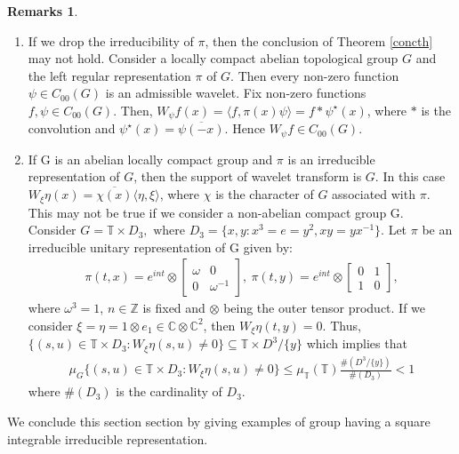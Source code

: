 \documentclass[11pt,reqno]{amsart}
\numberwithin{equation}{section}
\theoremstyle{definition}
\newtheorem{rems}[thm]{\sc Remarks}
\begin{document}
\begin{rems} \noindent
\begin{enumerate}
 \item If we drop the irreducibility of $\pi$, then the conclusion of  Theorem \ref{concth} may not hold.
 Consider a locally compact  abelian topological group $G$ and the left regular representation $\pi$ of $G$. Then every non-zero function  $\psi \in C_{00}(G)$ is an admissible wavelet. Fix non-zero functions $f,\psi \in C_{00}(G).$
 Then, $W_{\psi}f(x)=\langle f, \pi(x)\psi \rangle = f* \psi^{\star}(x)$, where $*$ is the convolution and $\psi^{\star}(x)= \overline{\psi(-x)}$.  Hence $W_{\psi}f \in C_{00}(G).$

 \item If G is an abelian locally compact group and $\pi$ is an irreducible representation of $G$, then the support of wavelet transform is $G.$ In this case $W_{\xi}\eta(x) =  \overline{ \chi(x)}\langle \eta, \xi\rangle$, where $\chi$ is the character of $G$ associated with $\pi.$ 
This may not be true if we consider a non-abelian compact group G.
 Consider $G = \mathbb{T}\times D_3, \text{ where } D_{3} = \{x,y : x^3 = e = y^2, xy = yx^{-1} \}.$
 Let $\pi$ be an irreducible unitary representation of G given by:
 \begin{align*}
 \pi(t,x) = e^{int} \otimes \begin{bmatrix}
 \omega & 0\\
 0 & \omega^{-1}
 \end{bmatrix},\ 
 \pi(t,y) = e^{int} \otimes \begin{bmatrix}
 0 & 1\\
 1 & 0
 \end{bmatrix}, 
 \end{align*}
  where $\omega^{3} = 1$,  $ n\in \mathbb{Z}$ is fixed and $\otimes $ being the outer tensor product.
 If we consider $\xi =  \eta =  1\otimes e_1 \in \mathbb{C} \otimes \mathbb{C}^2$, then $W_{\xi}\eta(t,y)= 0.$
 Thus, $\{ (s,u)\in \mathbb{T}\times D_{3}: W_{\xi}\eta (s,u)\neq 0\} \subseteq \mathbb{T} \times D^{3}/{\{y\}}$ which implies that
 \begin{align*}
\mu_{G}\{ (s,u)\in \mathbb{T}\times D_{3}: W_{\xi}\eta(s,u)\neq 0\} \leq \mu_{\mathbb{T}}(\mathbb{T})\frac{\#(D^{3}/{\{y\}})}{\#(D_3)} < 1
\end{align*} where $\#(D_{3})$ is the cardinality of $D_3.$ 
 \end{enumerate}
 \end{rems}
\noindent We conclude this section section by giving  examples of group having  a square integrable irreducible representation.
\end{document}
